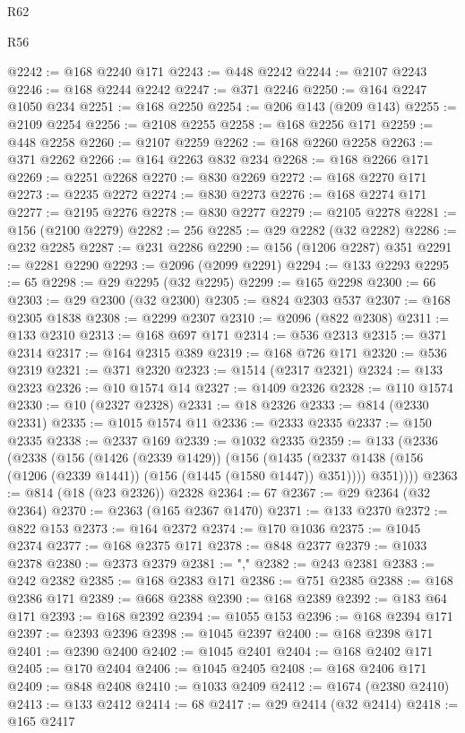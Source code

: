 \begin{lexlean}{R62}
\begin{lexlean}{R56}
\begin{coremodule}
{{{{{{{{{{{{{{{{{{{{{{{{{{{{{{{{{{{{{{{{{{{{{{{{{{{{{{{{{{{{{{{{{{{{{{{{{{{{{{{{{{{{{{{{{{{{{{{{{{{{{{{{{{{{{{{{{{{{{{{{{{{{{{{{{{{{{{{{{{{{{{{{{{{{{{{{{{{{{{{{{{{{{{{{{{{{{{{{{{{{{{{{{{{{{{{{{{{{{{{{{{{{{{{{{{{@2242 := @168 @2240 @171
@2243 := @448 @2242
@2244 := @2107 @2243
@2246 := @168 @2244 @2242
@2247 := @371 @2246
@2250 := @164 @2247 @1050 @234
@2251 := @168 @2250
@2254 := @206 @143 (@209 @143)
@2255 := @2109 @2254
@2256 := @2108 @2255
@2258 := @168 @2256 @171
@2259 := @448 @2258
@2260 := @2107 @2259
@2262 := @168 @2260 @2258
@2263 := @371 @2262
@2266 := @164 @2263 @832 @234
@2268 := @168 @2266 @171
@2269 := @2251 @2268
@2270 := @830 @2269
@2272 := @168 @2270 @171
@2273 := @2235 @2272
@2274 := @830 @2273
@2276 := @168 @2274 @171
@2277 := @2195 @2276
@2278 := @830 @2277
@2279 := @2105 @2278
@2281 := @156 (@2100 @2279)
@2282 := 256
@2285 := @29 @2282 (@32 @2282)
@2286 := @232 @2285
@2287 := @231 @2286
@2290 := @156 (@1206 @2287) @351
@2291 := @2281 @2290
@2293 := @2096 (@2099 @2291)
@2294 := @133 @2293
@2295 := 65
@2298 := @29 @2295 (@32 @2295)
@2299 := @165 @2298
@2300 := 66
@2303 := @29 @2300 (@32 @2300)
@2305 := @824 @2303 @537
@2307 := @168 @2305 @1838
@2308 := @2299 @2307
@2310 := @2096 (@822 @2308)
@2311 := @133 @2310
@2313 := @168 @697 @171
@2314 := @536 @2313
@2315 := @371 @2314
@2317 := @164 @2315 @389
@2319 := @168 @726 @171
@2320 := @536 @2319
@2321 := @371 @2320
@2323 := @1514 (@2317 @2321)
@2324 := @133 @2323
@2326 := @10 @1574 @14
@2327 := @1409 @2326
@2328 := @110 @1574
@2330 := @10 (@2327 @2328)
@2331 := @18 @2326
@2333 := @814 (@2330 @2331)
@2335 := @1015 @1574 @11
@2336 := @2333 @2335
@2337 := @150 @2335
@2338 := @2337 @169
@2339 := @1032 @2335
@2359 := @133
    (@2336
      (@2338
        (@156
          (@1426 (@2339 @1429))
          (@156
            (@1435 (@2337 @1438 (@156 (@1206 (@2339 @1441)) (@156 (@1445 (@1580 @1447)) @351))))
            @351))))
@2363 := @814 (@18 (@23 @2326)) @2328
@2364 := 67
@2367 := @29 @2364 (@32 @2364)
@2370 := @2363 (@165 @2367 @1470)
@2371 := @133 @2370
@2372 := @822 @153
@2373 := @164 @2372
@2374 := @170 @1036
@2375 := @1045 @2374
@2377 := @168 @2375 @171
@2378 := @848 @2377
@2379 := @1033 @2378
@2380 := @2373 @2379
@2381 := ","
@2382 := @243 @2381
@2383 := @242 @2382
@2385 := @168 @2383 @171
@2386 := @751 @2385
@2388 := @168 @2386 @171
@2389 := @668 @2388
@2390 := @168 @2389
@2392 := @183 @64 @171
@2393 := @168 @2392
@2394 := @1055 @153
@2396 := @168 @2394 @171
@2397 := @2393 @2396
@2398 := @1045 @2397
@2400 := @168 @2398 @171
@2401 := @2390 @2400
@2402 := @1045 @2401
@2404 := @168 @2402 @171
@2405 := @170 @2404
@2406 := @1045 @2405
@2408 := @168 @2406 @171
@2409 := @848 @2408
@2410 := @1033 @2409
@2412 := @1674 (@2380 @2410)
@2413 := @133 @2412
@2414 := 68
@2417 := @29 @2414 (@32 @2414)
@2418 := @165 @2417
}}}}}}}}}}}}}}}}}}}}}}}}}}}}}}}}}}}}}}}}}}}}}}}}}}}}}}}}}}}}}}}}}}}}}}}}}}}}}}}}}}}}}}}}}}}}}}}}}}}}}}}}}}}}}}}}}}}}}}}}}}}}}}}}}}}}}}}}}}}}}}}}}}}}}}}}}}}}}}}}}}}}}}}}}}}}}}}}}}}}}}}}}}}}}}}}}}}}}}}}}}}}}}}}}}}
\end{coremodule}
\end{lexlean}
\end{lexlean}
